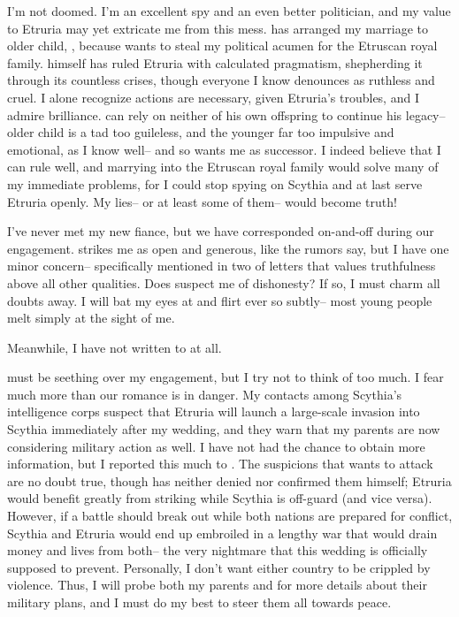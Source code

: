 \documentclass[char]{Kos}
\begin{document}
I'm not doomed. I'm an excellent spy and an even better politician, and my value to Etruria may yet extricate me from this mess. \cEtruriaKing{} has arranged my marriage to \cEtruriaKing{\their} older child, \cGroom{}, because \cEtruriaKing{\they} wants to steal my political acumen for the Etruscan royal family. \cEtruriaKing{\They} himself has ruled Etruria with calculated pragmatism, shepherding it through its countless crises, though everyone I know denounces \cEtruriaKing{\them} as ruthless and cruel. I alone recognize \cEtruriaKing{\their} actions are necessary, given Etruria's troubles, and I admire \cEtruriaKing{\their} brilliance. \cEtruriaKing{\They} can rely on neither of his own offspring to continue his legacy-- \cEtruriaKing{\their} older child is a tad too guileless, and the younger far too impulsive and emotional, as I know well-- and so \cEtruriaKing{\they} wants me as \cEtruriaKing{\their} successor. I indeed believe that I can rule well, and marrying into the Etruscan royal family would solve many of my immediate problems, for I could stop spying on Scythia and at last serve Etruria openly. My lies-- or at least some of them-- would become truth!
	
I've never met my new fiance, but we have corresponded on-and-off during our engagement. \cGroom{\They} strikes me as open and generous, like the rumors say, but I have one minor concern-- \cGroom{\they} specifically mentioned in two of \cGroom{\their} letters that \cGroom{\they} values truthfulness above all other qualities. Does \cGroom{\they} suspect me of dishonesty? If so, I must charm all \cGroom{\their} doubts away. I will bat my eyes at \cGroom{\them} and flirt ever so subtly-- most young people melt simply at the sight of me.

Meanwhile, I have not written to \cPoet{} at all. 

\cPoet{\They} must be seething over my engagement, but I try not to think of \cPoet{\them} too much. I fear much more than our romance is in danger. My contacts among Scythia's intelligence corps suspect that Etruria will launch a large-scale invasion into Scythia immediately after my wedding, and they warn that my parents are now considering military action as well. I have not had the chance to obtain more information, but I reported this much to \cEtruriaKing{}. The suspicions that \cEtruriaKing{\they} wants to attack are no doubt true, though \cEtruriaKing{\they} has neither denied nor confirmed them himself; Etruria would benefit greatly from striking while Scythia is off-guard (and vice versa). However, if a battle should break out while both nations are prepared for conflict, Scythia and Etruria would end up embroiled in a lengthy war that would drain money and lives from both-- the very nightmare that this wedding is officially supposed to prevent. Personally, I don't want either country to be crippled by violence. Thus, I will probe both my parents and \cEtruriaKing{} for more details about their military plans, and I must do my best to steer them all towards peace.
\end{document}
